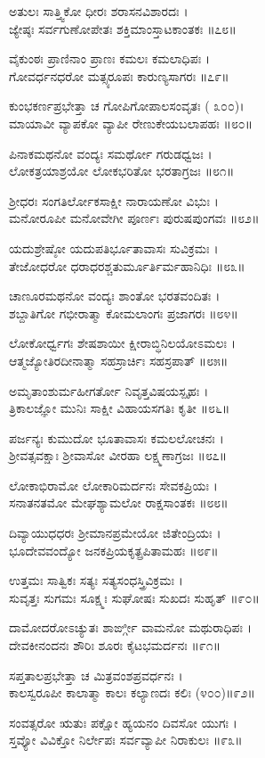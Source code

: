 ಅತುಲಃ ಸಾತ್ತ್ವಿಕೋ ಧೀರಃ ಶರಾಸನವಿಶಾರದಃ ।\\
ಜ್ಯೇಷ್ಠಃ ಸರ್ವಗುಣೋಪೇತಃ ಶಕ್ತಿಮಾಂಸ್ತಾಟಕಾಂತಕಃ ॥೭೮॥

ವೈಕುಂಠಃ ಪ್ರಾಣಿನಾಂ ಪ್ರಾಣಃ ಕಮಲಃ ಕಮಲಾಧಿಪಃ ।\\
ಗೋವರ್ಧನಧರೋ ಮತ್ಸ್ಯರೂಪಃ ಕಾರುಣ್ಯಸಾಗರಃ ॥೭೯॥

ಕುಂಭಕರ್ಣಪ್ರಭೇತ್ತಾ ಚ ಗೋಪಿಗೋಪಾಲಸಂವೃತಃ ( ೩೦೦)।\\
ಮಾಯಾವೀ ವ್ಯಾಪಕೋ ವ್ಯಾಪೀ ರೇಣುಕೇಯಬಲಾಪಹಃ ॥೮೦॥

ಪಿನಾಕಮಥನೋ ವಂದ್ಯಃ ಸಮರ್ಥೋ ಗರುಡಧ್ವಜಃ ।\\
ಲೋಕತ್ರಯಾಶ್ರಯೋ ಲೋಕಭರಿತೋ ಭರತಾಗ್ರಜಃ ॥೮೧॥

ಶ್ರೀಧರಃ ಸಂಗತಿರ್ಲೋಕಸಾಕ್ಷೀ ನಾರಾಯಣೋ ವಿಭುಃ ।\\
ಮನೋರೂಪೀ ಮನೋವೇಗೀ ಪೂರ್ಣಃ ಪುರುಷಪುಂಗವಃ ॥೮೨॥

ಯದುಶ್ರೇಷ್ಠೋ ಯದುಪತಿರ್ಭೂತಾವಾಸಃ ಸುವಿಕ್ರಮಃ ।\\
ತೇಜೋಧರೋ ಧರಾಧರಶ್ಚತುರ್ಮೂರ್ತಿರ್ಮಹಾನಿಧಿಃ ॥೮೩॥

ಚಾಣೂರಮಥನೋ ವಂದ್ಯಃ ಶಾಂತೋ ಭರತವಂದಿತಃ ।\\
ಶಬ್ದಾತಿಗೋ ಗಭೀರಾತ್ಮಾ ಕೋಮಲಾಂಗಃ ಪ್ರಜಾಗರಃ ॥೮೪॥

ಲೋಕೋರ್ಧ್ವಗಃ ಶೇಷಶಾಯೀ ಕ್ಷೀರಾಬ್ಧಿನಿಲಯೋಽಮಲಃ ।\\
ಆತ್ಮಜ್ಯೋತಿರದೀನಾತ್ಮಾ ಸಹಸ್ರಾರ್ಚಿಃ ಸಹಸ್ರಪಾತ್ ॥೮೫॥

ಅಮೃತಾಂಶುರ್ಮಹೀಗರ್ತೋ ನಿವೃತ್ತವಿಷಯಸ್ಪೃಹಃ ।\\
ತ್ರಿಕಾಲಜ್ಞೋ ಮುನಿಃ ಸಾಕ್ಷೀ ವಿಹಾಯಸಗತಿಃ ಕೃತೀ ॥೮೬॥

ಪರ್ಜನ್ಯಃ ಕುಮುದೋ ಭೂತಾವಾಸಃ ಕಮಲಲೋಚನಃ ।\\
ಶ್ರೀವತ್ಸವಕ್ಷಾಃ ಶ್ರೀವಾಸೋ ವೀರಹಾ ಲಕ್ಷ್ಮಣಾಗ್ರಜಃ ॥೮೭॥

ಲೋಕಾಭಿರಾಮೋ ಲೋಕಾರಿಮರ್ದನಃ ಸೇವಕಪ್ರಿಯಃ ।\\
ಸನಾತನತಮೋ ಮೇಘಶ್ಯಾಮಲೋ ರಾಕ್ಷಸಾಂತಕಃ ॥೮೮॥

ದಿವ್ಯಾಯುಧಧರಃ ಶ್ರೀಮಾನಪ್ರಮೇಯೋ ಜಿತೇಂದ್ರಿಯಃ ।\\
ಭೂದೇವವಂದ್ಯೋ ಜನಕಪ್ರಿಯಕೃತ್ಪ್ರಪಿತಾಮಹಃ ॥೮೯॥

ಉತ್ತಮಃ ಸಾತ್ವಿಕಃ ಸತ್ಯಃ ಸತ್ಯಸಂಧಸ್ತ್ರಿವಿಕ್ರಮಃ ।\\
ಸುವೃತ್ತಃ ಸುಗಮಃ ಸೂಕ್ಷ್ಮಃ ಸುಘೋಷಃ ಸುಖದಃ ಸುಹೃತ್ ॥೯೦॥

ದಾಮೋದರೋಽಚ್ಯುತಃ ಶಾರ್ಙ್ಗೀ ವಾಮನೋ ಮಥುರಾಧಿಪಃ ।\\
ದೇವಕೀನಂದನಃ ಶೌರಿಃ ಶೂರಃ ಕೈಟಭಮರ್ದನಃ ॥೯೧॥

ಸಪ್ತತಾಲಪ್ರಭೇತ್ತಾ ಚ ಮಿತ್ರವಂಶಪ್ರವರ್ಧನಃ ।\\
ಕಾಲಸ್ವರೂಪೀ ಕಾಲಾತ್ಮಾ ಕಾಲಃ ಕಲ್ಯಾಣದಃ ಕಲಿಃ (೪೦೦)॥೯೨॥

ಸಂವತ್ಸರೋ ಋತುಃ ಪಕ್ಷೋ ಹ್ಯಯನಂ ದಿವಸೋ ಯುಗಃ ।\\
ಸ್ತವ್ಯೋ ವಿವಿಕ್ತೋ ನಿರ್ಲೇಪಃ ಸರ್ವವ್ಯಾಪೀ ನಿರಾಕುಲಃ ॥೯೩॥

